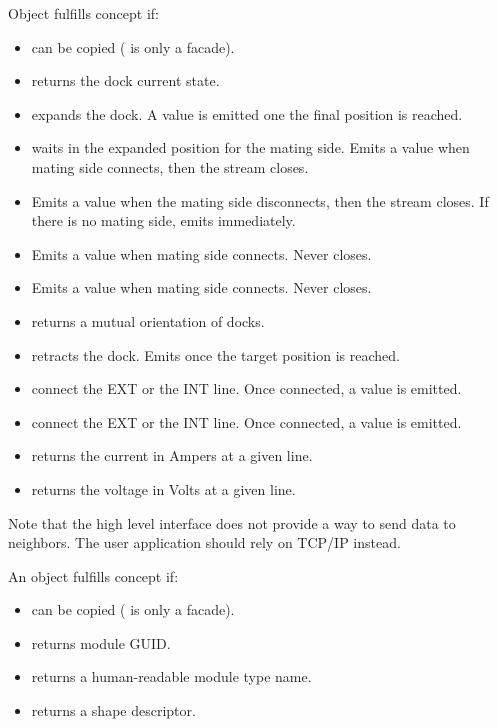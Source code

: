 \noindent Object  fulfills concept  if:
\begin{itemize}
    \item {} can be copied ( is only a facade).
    \item {} returns the dock current
    state.
    \item {} expands the dock. A value is
    emitted one the final position is reached.
    \item {} waits in the expanded
    position for the mating side. Emits a value when mating side connects, then
    the stream closes.
    \item {} Emits a value when the
    mating side disconnects, then the stream closes. If there is no mating side,
    emits immediately.
    \item {} Emits a value when mating side
    connects. Never closes.
    \item {} Emits a value when mating
    side connects. Never closes.
    \item {} returns
    a mutual orientation of docks.
    \item {} retracts the dock. Emits once
    the target position is reached.
    \item {} connect the EXT or the
    INT line. Once connected, a value is emitted.
    \item {} connect the EXT or
    the INT line. Once connected, a value is emitted.
    \item {} returns the current in
    Ampers at a given line.
    \item {} returns the voltage in
    Volts at a given line.
\end{itemize}
Note that the high level interface does not provide a way to send data to
neighbors. The user application should rely on TCP/IP instead.

An object  fulfills concept  if:
\begin{itemize}
    \item {} can be copied ( is only a facade).
    \item {} returns module GUID.
    \item {} returns a human-readable
    module type name.
    \item {} returns a shape
    descriptor.
\end{itemize}